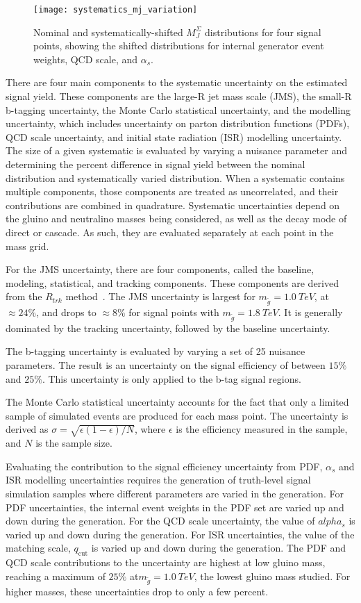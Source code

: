 \begin{figure}[!ht]
    \centering
    \texttt{[image: systematics\_mj\_variation]}
    \caption{Nominal and systematically-shifted $M_{J}^{\Sigma}$ distributions for four signal points, showing the shifted distributions for internal generator event weights, QCD scale, and $\alpha_{s}$.}
    \label{fig:systematics_mj}
\end{figure}


There are four main components to the systematic uncertainty on the estimated signal yield.
These components are the large-R jet mass scale (JMS), the small-R b-tagging uncertainty, the Monte Carlo statistical uncertainty, and the modelling uncertainty, which includes uncertainty on parton distribution functions (PDFs), QCD scale uncertainty, and initial state radiation (ISR) modelling uncertainty.
The size of a given systematic is evaluated by varying a nuisance parameter and determining the percent difference in signal yield between the nominal distribution and systematically varied distribution.
When a systematic contains multiple components, those components are treated as uncorrelated, and their contributions are combined in quadrature.
Systematic uncertainties depend on the gluino and neutralino masses being considered, as well as the decay mode of direct or cascade.
As such, they are evaluated separately at each point in the mass grid.

For the JMS uncertainty, there are four components, called the baseline, modeling, statistical, and tracking components.
These components are derived from the $R_{trk}$ method~\cite{jet-substructure-perf}.
The JMS uncertainty is largest for $m_{\tilde{g}}=1.0~TeV$, at $\approx 24\%$, and drops to $\approx 8\%$ for signal points with $m_{\tilde{g}}=1.8~TeV$.
It is generally dominated by the tracking uncertainty, followed by the baseline uncertainty.

The b-tagging uncertainty is evaluated by varying a set of 25 nuisance parameters.
The result is an uncertainty on the signal efficiency of between $15\%$ and $25\%$.
This uncertainty is only applied to the b-tag signal regions.

The Monte Carlo statistical uncertainty accounts for the fact that only a limited sample of simulated events are produced for each mass point.
The uncertainty is derived as $\sigma=\sqrt{\epsilon(1-\epsilon)/N}$, where $\epsilon$ is the efficiency measured in the sample, and $N$ is the sample size.

Evaluating the contribution to the signal efficiency uncertainty from PDF, $\alpha_s$ and ISR modelling uncertainties requires the generation of truth-level signal simulation samples where different parameters are varied in the generation.
For PDF uncertainties, the internal event weights in the PDF set are varied up and down during the generation.
For the QCD scale uncertainty, the value of $alpha_s$ is varied up and down during the generation.
For ISR uncertainties, the value of the matching scale, $q_{\textrm{cut}}$ is varied up and down during the generation.
The PDF and QCD scale contributions to the uncertainty are highest at low gluino mass, reaching a maximum of $25\%$ at$m_{\tilde{g}}=1.0~TeV$, the lowest gluino mass studied.
For higher masses, these uncertainties drop to only a few percent.

